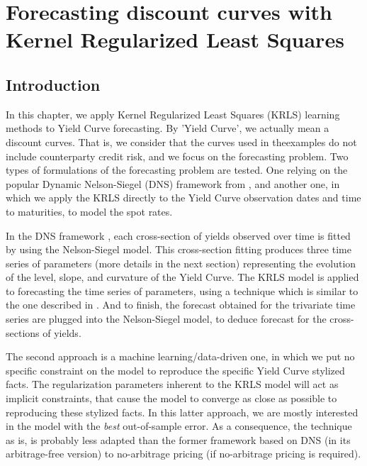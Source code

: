 %
\chapter{Forecasting discount curves with Kernel Regularized Least Squares}
\label{sec:discount_curve_krls}


\section{Introduction}

In this chapter, we apply Kernel Regularized Least Squares (KRLS) learning methods to Yield Curve forecasting. By 'Yield Curve', we actually mean a discount curves. That is, we consider that the curves used in theexamples do not include counterparty credit risk, and we focus on the forecasting problem. Two types of formulations of the forecasting problem are tested. One relying on the popular Dynamic Nelson-Siegel (DNS) framework from \cite{diebold2006forecasting}, and another one, in which we apply the KRLS directly to the Yield Curve observation dates and time to maturities, to model the spot rates.

\medskip

In the DNS framework \cite{diebold2006forecasting}, each cross-section of yields observed over time is fitted by using the Nelson-Siegel \cite{nelson1987parsimonious} model. This cross-section fitting produces three time series of parameters (more details in the next section) representing the evolution of the level, slope, and curvature of the Yield Curve. The KRLS model  is applied to forecasting  the time series of parameters, using a technique which is similar to the one described in \cite{exterkate2016nonlinear}. And to finish, the forecast obtained for the trivariate time series are plugged into the Nelson-Siegel model, to deduce forecast for the cross-sections of yields.

\medskip

The second approach is a machine learning/data-driven one, in which we put no  specific constraint on the model to reproduce the specific Yield Curve stylized facts. The regularization parameters inherent to the KRLS model will act as implicit constraints, that cause the model to converge as close as possible to reproducing these stylized facts. In this latter approach, we are mostly interested in the model with the {\it best} out-of-sample error. As a consequence, the technique as is, is probably less adapted than the former framework based on DNS (in its arbitrage-free version) to no-arbitrage pricing (if no-arbitrage pricing is required).

